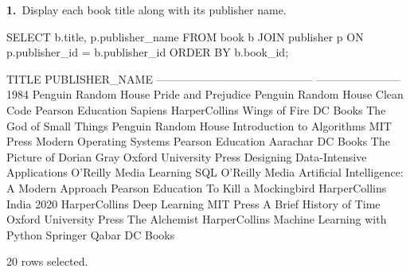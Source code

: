 \noindent\begin{minipage}{\linewidth}
\begingroup{}
{\fontsize{14}{17}\selectfont\textbf{1.}}\ Display each book title along with its publisher name.\par
\endgroup\vspace{12pt}


\begin{sqlcode}
SELECT b.title, p.publisher_name
FROM book b
JOIN publisher p ON p.publisher_id = b.publisher_id
ORDER BY b.book_id;
\end{sqlcode}

\vspace{18pt}


\begin{sqlout}[fontsize=\small]
TITLE                                       PUBLISHER_NAME         
------------------------------------------  -----------------------
1984                                        Penguin Random House
Pride and Prejudice                         Penguin Random House
Clean Code                                  Pearson Education
Sapiens                                     HarperCollins
Wings of Fire                               DC Books
The God of Small Things                     Penguin Random House
Introduction to Algorithms                  MIT Press
Modern Operating Systems                    Pearson Education
Aarachar                                    DC Books
The Picture of Dorian Gray                  Oxford University Press
Designing Data-Intensive Applications       O'Reilly Media
Learning SQL                                O'Reilly Media
Artificial Intelligence: A Modern Approach  Pearson Education
To Kill a Mockingbird                       HarperCollins
India 2020                                  HarperCollins
Deep Learning                               MIT Press
A Brief History of Time                     Oxford University Press
The Alchemist                               HarperCollins
Machine Learning with Python                Springer
Qabar                                       DC Books

20 rows selected.
\end{sqlout}
\end{minipage}\par\vspace{24pt}

